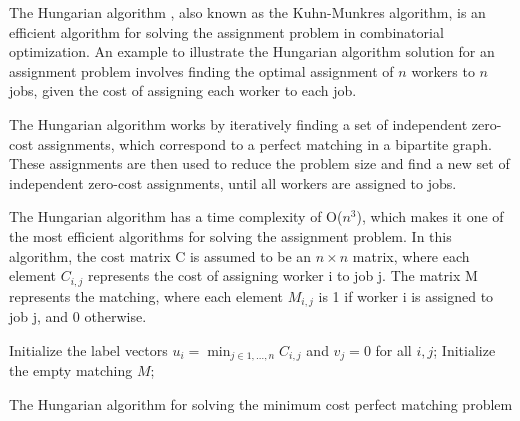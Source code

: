 The Hungarian algorithm \cite{kuhn1955hungarian}, also known as the Kuhn-Munkres algorithm, is an efficient algorithm for solving the assignment problem in combinatorial optimization. An example to illustrate the Hungarian algorithm solution for an assignment problem involves finding the optimal assignment of $n$ workers to $n$ jobs, given the cost of assigning each worker to each job.

The Hungarian algorithm works by iteratively finding a set of independent zero-cost assignments, which correspond to a perfect matching in a bipartite graph. These assignments are then used to reduce the problem size and find a new set of independent zero-cost assignments, until all workers are assigned to jobs.

The Hungarian algorithm has a time complexity of O($n^3$), which makes it one of the most efficient algorithms for solving the assignment problem. In this algorithm, the cost matrix C is assumed to be an $n \times n$ matrix, where each element $C_{i,j}$ represents the cost of assigning worker i to job j. The matrix M represents the matching, where each element $M_{i,j}$ is 1 if worker i is assigned to job j, and 0 otherwise.

\begin{algorithm}[]
	\SetAlgoLined
	\DontPrintSemicolon
	Initialize the label vectors $u_i = \min_{j\in{1,\dots,n}} C_{i,j}$ and $v_j=0$ for all $i,j$;
	Initialize the empty matching $M$;
	\caption{The Hungarian algorithm for solving the minimum cost perfect matching problem}
	\label{alg:3_ha}
\end{algorithm}

